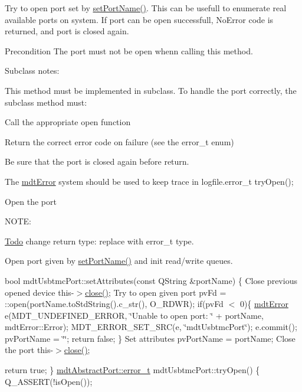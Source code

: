 Try to open port set by \hyperlink{classmdt_abstract_port_a0ca143d32fc677bac7c1cf0e04144932}{setPortName()}. This can be usefull to enumerate real available ports on system. If port can be open successfull, NoError code is returned, and port is closed again. \begin{DoxyPrecond}{Precondition}
The port must not be open whenn calling this method.
\end{DoxyPrecond}
Subclass notes:\par
 This method must be implemented in subclass. To handle the port correctly, the subclass method must:
\begin{DoxyItemize}
\item Call the appropriate open function
\item Return the correct error code on failure (see the error\_\-t enum)
\item Be sure that the port is closed again before return.
\item The \hyperlink{classmdt_error}{mdtError} system should be used to keep trace in logfile.error\_\-t tryOpen();
\end{DoxyItemize}

Open the port

NOTE:\begin{Desc}
\item[\hyperlink{todo__todo000005}{Todo}]change return type: replace with error\_\-t type.\end{Desc}


Open port given by \hyperlink{classmdt_abstract_port_a0ca143d32fc677bac7c1cf0e04144932}{setPortName()} and init read/write queues.

bool mdtUsbtmcPort::setAttributes(const QString \&portName) \{ Close previous opened device this-\/$>$\hyperlink{classmdt_abstract_port_a1ace1a2bd1a04f16952980e247b04800}{close()}; Try to open given port pvFd = ::open(portName.toStdString().c\_\-str(), O\_\-RDWR); if(pvFd $<$ 0)\{ \hyperlink{classmdt_error}{mdtError} e(MDT\_\-UNDEFINED\_\-ERROR, \char`\"{}Unable to open port: \char`\"{} + portName, mdtError::Error); MDT\_\-ERROR\_\-SET\_\-SRC(e, \char`\"{}mdtUsbtmcPort\char`\"{}); e.commit(); pvPortName = \char`\"{}\char`\"{}; return false; \} Set attributes pvPortName = portName; Close the port this-\/$>$\hyperlink{classmdt_abstract_port_a1ace1a2bd1a04f16952980e247b04800}{close()};

return true; \} \hyperlink{classmdt_abstract_port_ad4121bb930c95887e77f8bafa065a85e}{mdtAbstractPort::error\_\-t} mdtUsbtmcPort::tryOpen() \{ Q\_\-ASSERT(!isOpen());

